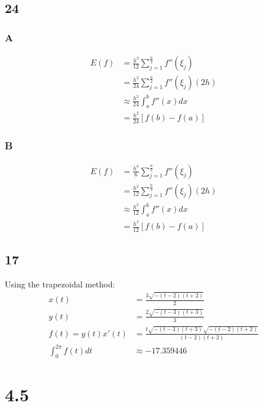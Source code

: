 \documentclass{oisinclass}
\begin{document}
\subsection*{24}
\subsubsection*{A}
\begin{align*}
	E(f) & = \frac{h^3}{12}\sum_{j=1}^{\frac{n}{2}}f''(\xi_j)     \\
	     & = \frac{h^2}{24}\sum_{j=1}^{\frac{n}{2}}f''(\xi_j)(2h) \\
	     & \approx \frac{h^2}{24}\int_{a}^{b}f''(x)dx             \\
	     & = \frac{h^2}{24} \left[f(b) - f(a)\right]
\end{align*}
\subsubsection*{B}
\begin{align*}
	E(f) & = \frac{h^3}{6}\sum_{j=1}^{\frac{n}{2}}f''(\xi_j)      \\
	     & = \frac{h^2}{12}\sum_{j=1}^{\frac{n}{2}}f''(\xi_j)(2h) \\
	     & \approx \frac{h^2}{12}\int_a^bf''(x) dx                \\
	     & = \frac{h^2}{12} \left[f(b) - f(a)\right]
\end{align*}

\subsection*{17}
Using the trapezoidal method:
\begin{align*}
	x(t)                & = \frac{3 \sqrt{- \left(t - 2\right) \left(t + 2\right)}}{2}                                                                                    \\
	y(t)                & = \frac{2 \sqrt{- \left(t - 3\right) \left(t + 3\right)}}{3}                                                                                    \\
	f(t) = y(t)x'(t)    & = \frac{t \sqrt{- \left(t - 3\right) \left(t + 3\right)} \sqrt{- \left(t - 2\right) \left(t + 2\right)}}{\left(t - 2\right) \left(t + 2\right)} \\
	\int_0^{2\pi}f(t)dt & \approx -17.359446
\end{align*}

\section*{4.5}
\end{document}
